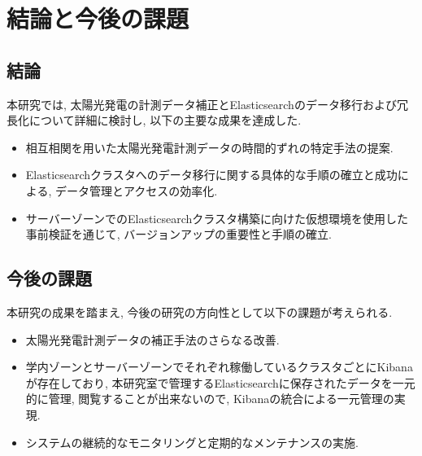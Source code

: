 \chapter{結論と今後の課題}
\label{chap:fifth}

\section{結論}
本研究では, 太陽光発電の計測データ補正とElasticsearchのデータ移行および冗長化について詳細に検討し, 以下の主要な成果を達成した.




\begin{itemize}
  \item 相互相関を用いた太陽光発電計測データの時間的ずれの特定手法の提案.
  \item Elasticsearchクラスタへのデータ移行に関する具体的な手順の確立と成功による, データ管理とアクセスの効率化.
  \item サーバーゾーンでのElasticsearchクラスタ構築に向けた仮想環境を使用した事前検証を通じて, バージョンアップの重要性と手順の確立.
\end{itemize}

\section{今後の課題}
本研究の成果を踏まえ, 今後の研究の方向性として以下の課題が考えられる.

\begin{itemize}
  \item 太陽光発電計測データの補正手法のさらなる改善.
  \item 学内ゾーンとサーバーゾーンでそれぞれ稼働しているクラスタごとにKibanaが存在しており, 本研究室で管理するElasticsearchに保存されたデータを一元的に管理, 閲覧することが出来ないので, Kibanaの統合による一元管理の実現.
  \item システムの継続的なモニタリングと定期的なメンテナンスの実施.
\end{itemize}
